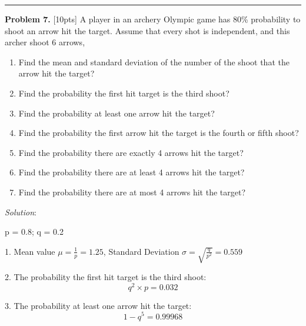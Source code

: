\documentclass[12pt]{amsart}
\begin{document}
\smallskip

\hrule

\bigskip

\bigskip 
\textbf{Problem 7. }[10pts] A player in an archery Olympic game has 80\% probability to shoot an arrow hit the
target. Assume that every shot is independent, and this archer shoot 6 arrows,
\begin{enumerate}
    \item Find the mean and standard deviation of the number of the shoot that the arrow hit the target?
    \item Find the probability the first hit target is the third shoot?
    \item Find the probability at least one arrow hit the target?
    \item Find the probability the first arrow hit the target is the fourth or fifth shoot?
    \item Find the probability there are exactly 4 arrows hit the target?
    \item Find the probability there are at least 4 arrows hit the target?
    \item Find the probability there are at most 4 arrows hit the target?
\end{enumerate}
\bigskip

\textit{Solution}:

p = 0.8; q = 0.2

1. Mean value $\displaystyle \mu=\frac{1}{p}=\mathbf{1.25}$, Standard Deviation $\displaystyle \sigma = \sqrt{\frac{q}{p^2}}=\mathbf{0.559}$

2. The probability the first hit target is the third shoot: \[ q^2\times p= \mathbf{0.032}\]

3. The probability at least one arrow hit the target: 
\[1-q^5=\mathbf{0.99968}\]
\end{document}
